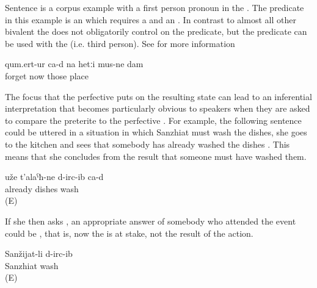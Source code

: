 Sentence  is a corpus example with a first person pronoun in the . The predicate in this example is an  which requires a   and an  . In contrast to almost all other bivalent  the  does not obligatorily control  on the predicate, but the predicate can be used with the  (i.e. third person). See  for more information

\begin{exe}
	\ex	\label{ex:Now I have forgotten those places analytic}
	\gll	qum.ert-ur ca-d	na	hetːi	mus-ne	dam\\
		forget 	now	those	place	\\
	\glt	{}
\end{exe}


The focus that the perfective  puts on the resulting state can lead to an inferential interpretation that becomes particularly obvious to speakers when they are asked to compare the preterite to the perfective . For example, the following sentence could be uttered in a situation in which Sanzhiat must wash the dishes, she goes to the kitchen and sees that somebody has already washed the dishes . This means that she concludes from the result that someone must have washed them.
%
\begin{exe}
	\ex	\label{ex:The dishes have already been washed}
	\gll	uže	t'alaˁħ-ne	d-irc-ib	ca-d\\
		already	dishes	wash	\\
	\glt	{} (E)
\end{exe}

If she then asks  , an appropriate answer of somebody who attended the event could be , that is, now the  is at stake, not the result of the action.
%
\begin{exe}
	\ex	\label{ex:Sanzhiat washed (them)}
	\gll	Sanžijat-li	d-irc-ib\\
		Sanzhiat	wash\\
	\glt	{} (E)
\end{exe}

